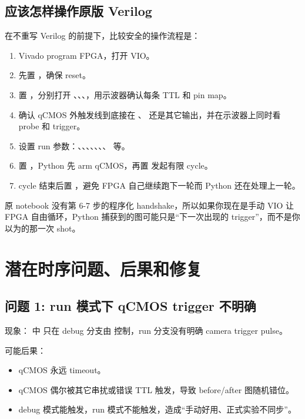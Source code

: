\documentclass[11pt,oneside,openany]{book}
\begin{document}
\section{应该怎样操作原版 Verilog}
在不重写 Verilog 的前提下，比较安全的操作流程是：
\begin{enumerate}
  \item Vivado program FPGA，打开 VIO。
  \item 先置 ，确保  reset。
  \item 置 ，分别打开 、、、，用示波器确认每条 TTL 和 pin map。
  \item 确认 qCMOS 外触发线到底接在 、 还是其它输出，并在示波器上同时看 probe 和 trigger。
  \item 设置 run 参数：、、、、、、、 等。
  \item 置 ，Python 先 arm qCMOS，再置  发起有限 cycle。
  \item cycle 结束后置 ，避免 FPGA 自己继续跑下一轮而 Python 还在处理上一轮。
\end{enumerate}

原 notebook 没有第 6-7 步的程序化 handshake，所以如果你现在是手动 VIO 让 FPGA 自由循环，Python 捕获到的图可能只是“下一次出现的 trigger”，而不是你以为的那一次 shot。

\chapter{潜在时序问题、后果和修复}
\section{问题 1: run 模式下 qCMOS trigger 不明确}
现象： 中  只在 debug 分支由  控制，run 分支没有明确 camera trigger pulse。

可能后果：
\begin{itemize}
  \item qCMOS 永远 timeout。
  \item qCMOS 偶尔被其它串扰或错误 TTL 触发，导致 before/after 图随机错位。
  \item debug 模式能触发，run 模式不能触发，造成“手动好用、正式实验不同步”。
\end{itemize}
\end{document}
